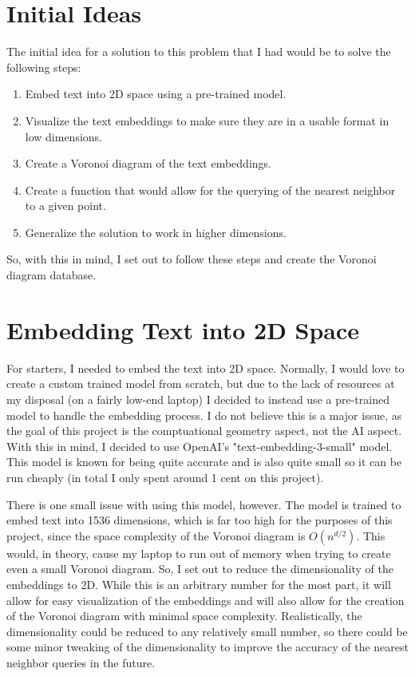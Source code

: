\documentclass{article}
\begin{document}
\section{Initial Ideas}
The initial idea for a solution to this problem that I had would be to
solve the following steps:

\begin{enumerate}
	\item Embed text into 2D space using a pre-trained model.
	\item Visualize the text embeddings to make sure they are in a
        usable format in low dimensions.
    \item Create a Voronoi diagram of the text embeddings.
	\item Create a function that would allow for the querying of the
		nearest neighbor to a given point.
	\item Generalize the solution to work in higher dimensions.
\end{enumerate}

\noindent
So, with this in mind, I set out to follow these steps and create the
Voronoi diagram database. 
\section{Embedding Text into 2D Space}
For starters, I needed to embed the text into 2D space. Normally, I would
love to create a custom trained model from scratch, but due to the lack of 
resources at my disposal (on a fairly low-end laptop) I decided to instead
use a pre-trained model to handle the embedding process. I do not believe this
is a major issue, as the goal of this project is the comptuational geometry
aspect, not the AI aspect. With this in mind, I decided to use OpenAI's "text-embedding-3-small" model.
This model is known for being quite accurate and is also quite small so 
it can be run cheaply (in total I only spent around 1 cent on this project).
\newline

\noindent
There is one small issue with using this model, however. The model is trained
to embed text into 1536 dimensions, which is far too high for the purposes of this project,
since the space complexity of the Voronoi diagram is $O(n^{d/2})$. This would, in theory, 
cause my laptop to run out of memory when trying to create even a small Voronoi diagram.
So, I set out to reduce the dimensionality of the embeddings to 2D. While this is an arbitrary number
for the most part, it will allow for easy visualization of the embeddings and will also allow for 
the creation of the Voronoi diagram with minimal space complexity. Realistically, the dimensionality
could be reduced to any relatively small number, so there could be some minor tweaking of the dimensionality
to improve the accuracy of the nearest neighbor queries in the future.
\end{document}
